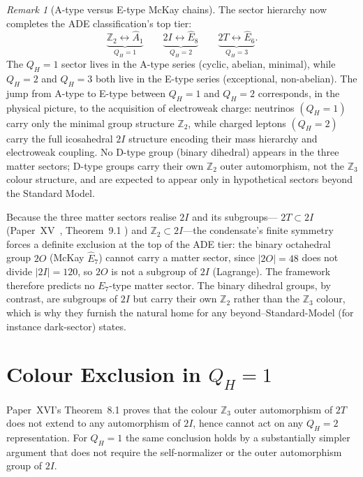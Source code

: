 \documentclass[11pt,a4paper]{article}
\theoremstyle{definition}\newtheorem{definition}[theorem]{Definition}
\theoremstyle{remark}
\newtheorem{remark}[theorem]{Remark}
\newcommand{\twoI}{2I}
\newcommand{\twoT}{2T}
\newcommand{\twoO}{2O}
\newcommand{\QH}{Q_H}
\newcommand{\Ztwo}{\mathbb{Z}_2}
\newcommand{\Zthree}{\mathbb{Z}_3}
\begin{document}
\begin{remark}[A-type versus E-type McKay chains]
\label{P17:rem:ade_structure}
The sector hierarchy now completes the ADE classification's top tier:
\[
  \underbrace{\Ztwo\leftrightarrow\widehat{A}_1}_{\QH=1}
  \qquad
  \underbrace{\twoI\leftrightarrow\widehat{E}_8}_{\QH=2}
  \qquad
  \underbrace{\twoT\leftrightarrow\widehat{E}_6}_{\QH=3}.
\]
The $\QH=1$ sector lives in the A-type series (cyclic, abelian,
minimal), while $\QH=2$ and $\QH=3$ both live in the E-type series
(exceptional, non-abelian). The jump from A-type to E-type between
$\QH=1$ and $\QH=2$ corresponds, in the physical picture, to the
acquisition of electroweak charge: neutrinos $(\QH=1)$ carry only the
minimal group structure $\Ztwo$, while charged leptons $(\QH=2)$ carry
the full icosahedral $\twoI$ structure encoding their mass hierarchy
and electroweak coupling. No D-type group (binary dihedral) appears
in the three matter sectors; D-type groups carry their own $\Ztwo$
outer automorphism, not the $\Zthree$ colour structure, and are
expected to appear only in hypothetical sectors beyond the Standard
Model.

Because the three matter sectors realise $\twoI$ and its subgroups---%
$\twoT\subset\twoI$ (Paper~XV~\cite{Paper15}, Theorem~9.1 %
) and $\Ztwo\subset\twoI$---the condensate's finite symmetry forces a
definite exclusion at the top of the ADE tier: the binary octahedral
group $\twoO$ (McKay $\widehat{E}_7$) cannot carry a matter sector,
since $|\twoO|=48$ does not divide $|\twoI|=120$, so $\twoO$ is not a
subgroup of $\twoI$ (Lagrange). The framework therefore predicts no
$E_7$-type matter sector. The binary dihedral groups, by contrast, are
subgroups of $\twoI$ but carry their own $\Ztwo$ rather than the
$\Zthree$ colour, which is why they furnish the natural home for any
beyond--Standard-Model (for instance dark-sector) states.
\end{remark}

\section{Colour Exclusion in $Q_H=1$}
\label{P17:sec:colour}

Paper~XVI's Theorem~8.1 %
proves that the colour $\Zthree$ outer automorphism of $\twoT$ does
not extend to any automorphism of $\twoI$, hence cannot act on any
$\QH=2$ representation. For $\QH=1$ the same conclusion holds by a
substantially simpler argument that does not require the
self-normalizer or the outer automorphism group of $\twoI$.
\end{document}
